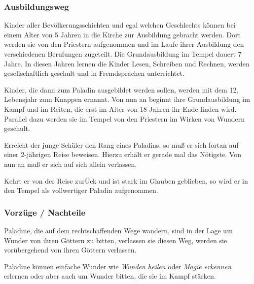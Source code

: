 \subsubsection{Ausbildungsweg}
\par Kinder aller Bevölkerungsschichten und egal welchen Geschlechts können bei einem Alter von 5 Jahren in die 
Kirche zur Ausbildung gebracht werden. Dort werden sie von den Priestern aufgenommen und im Laufe ihrer Ausbildung 
den verschiedenen Berufungen zugeteilt. Die Grundausbildung im Tempel dauert 7 Jahre. In diesen Jahren lernen die 
Kinder Lesen, Schreiben und Rechnen, werden gesellschaftlich geschult und in Fremdsprachen unterrichtet.
\par Kinder, die dann zum Paladin ausgebildet werden sollen, werden mit dem 12. Lebensjahr zum Knappen ernannt. Von 
nun an beginnt ihre Grundausbildung im Kampf und im Reiten, die erst im Alter von 18 Jahren ihr Ende finden wird. 
Parallel dazu werden sie im Tempel von den Priestern im Wirken von Wundern geschult.
\par Erreicht der junge Schüler den Rang eines Paladins, so muß er sich fortan auf einer 2-jährigen Reise beweisen. 
Hierzu erhält er gerade mal das Nötigste. Von nun an muß er sich auf sich allein verlassen.
\par Kehrt er von der Reise zurÜck und ist stark im Glauben geblieben, so wird er in den Tempel als vollwertiger 
Paladin aufgenommen.
\subsubsection{Vorzüge / Nachteile}
\par Paladine, die auf dem rechtschaffenden Wege wandern, sind in der Lage um Wunder von ihren Göttern zu bitten, 
verlassen sie diesen Weg, werden sie vorübergehend von ihren Göttern verlassen.
\par Paladine können einfache Wunder wie \textit{Wunden heilen} oder \textit{Magie erkennen} erlernen oder aber auch 
um Wunder bitten, die sie im Kampf stärken.

